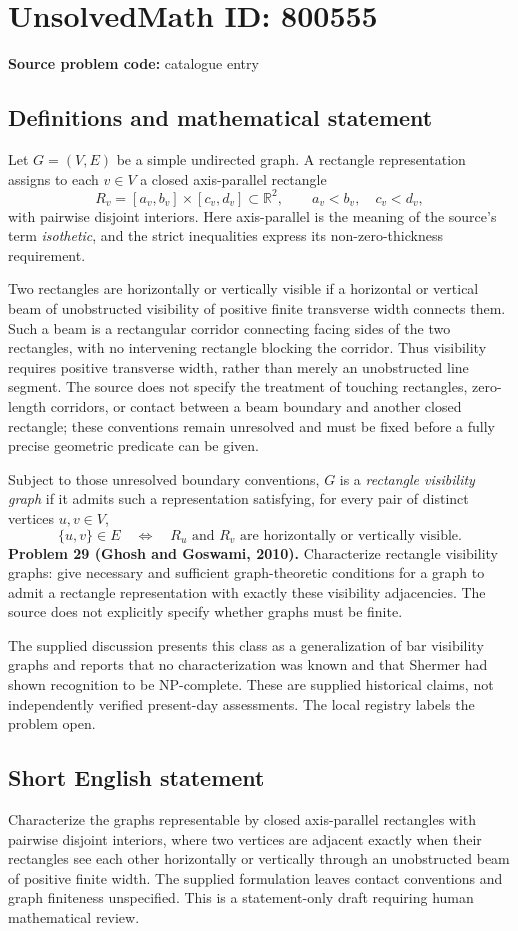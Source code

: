 \documentclass[11pt]{article}
\newcommand{\R}{\mathbb{R}}
\begin{document}
\section*{UnsolvedMath ID: 800555}
\textbf{Source problem code:} catalogue entry
\subsection{Definitions and mathematical statement}
Let \(G=(V,E)\) be a simple undirected graph. A rectangle representation assigns to each \(v\in V\) a closed axis-parallel rectangle
\[
R_v=[a_v,b_v]\times[c_v,d_v]\subset\R^2,
\qquad a_v<b_v,\quad c_v<d_v,
\]
with pairwise disjoint interiors. Here axis-parallel is the meaning of the source's term \emph{isothetic}, and the strict inequalities express its non-zero-thickness requirement.

Two rectangles are horizontally or vertically visible if a horizontal or vertical beam of unobstructed visibility of positive finite transverse width connects them. Such a beam is a rectangular corridor connecting facing sides of the two rectangles, with no intervening rectangle blocking the corridor. Thus visibility requires positive transverse width, rather than merely an unobstructed line segment. The source does not specify the treatment of touching rectangles, zero-length corridors, or contact between a beam boundary and another closed rectangle; these conventions remain unresolved and must be fixed before a fully precise geometric predicate can be given.

Subject to those unresolved boundary conventions, \(G\) is a \emph{rectangle visibility graph} if it admits such a representation satisfying, for every pair of distinct vertices \(u,v\in V\),
\[
\{u,v\}\in E
\quad\Longleftrightarrow\quad
R_u\text{ and }R_v\text{ are horizontally or vertically visible}.
\]
\textbf{Problem 29 (Ghosh and Goswami, 2010).} Characterize rectangle visibility graphs: give necessary and sufficient graph-theoretic conditions for a graph to admit a rectangle representation with exactly these visibility adjacencies. The source does not explicitly specify whether graphs must be finite.

The supplied discussion presents this class as a generalization of bar visibility graphs and reports that no characterization was known and that Shermer had shown recognition to be NP-complete. These are supplied historical claims, not independently verified present-day assessments. The local registry labels the problem open.
\subsection{Short English statement}
Characterize the graphs representable by closed axis-parallel rectangles with pairwise disjoint interiors, where two vertices are adjacent exactly when their rectangles see each other horizontally or vertically through an unobstructed beam of positive finite width. The supplied formulation leaves contact conventions and graph finiteness unspecified. This is a statement-only draft requiring human mathematical review.
\end{document}
